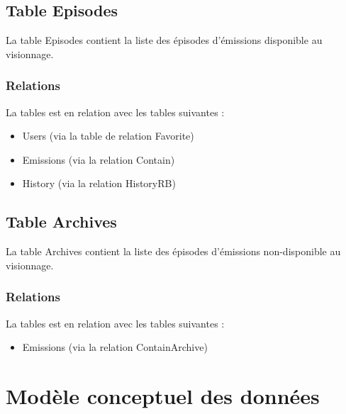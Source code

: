 \documentclass[12pt]{article}
\begin{document}
\subsection{Table Episodes}
La table Episodes contient la liste des épisodes d'émissions disponible au visionnage.
\subsubsection{Relations}
La tables est en relation avec les tables suivantes :
\begin{itemize}
\item Users (via la table de relation Favorite)
\item Emissions (via la relation Contain)
\item History (via la relation HistoryRB)
\end{itemize}

\subsection{Table Archives}
La table Archives contient la liste des épisodes d'émissions non-disponible au visionnage.
\subsubsection{Relations}
La tables est en relation avec les tables suivantes :
\begin{itemize}
\item Emissions (via la relation ContainArchive)
\end{itemize}

\section{Modèle conceptuel des données}
\vspace{5mm}
\center
{}
\end{document}
